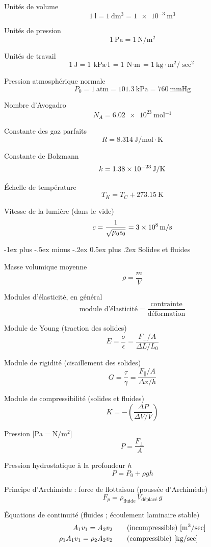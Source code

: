 \documentclass[10pt,landscape]{article}
\makeatletter
\renewcommand{\section}{\@startsection{section}{1}{0mm}%
                                {-1ex plus -.5ex minus -.2ex}%
                                {0.5ex plus .2ex}%
                                {\normalfont\large\bfseries}}
\makeatother
\begin{document}
\begin{multicols}{3}
Unités de volume
\[ \SI{1}{\litre} = \SI{1}{\deci\meter^3} =  \SI{1e-3}{\meter^3} \]

Unités de pression
\[ \SI{1}{\pascal} = \SI{1}{\newton/\meter^2} \]

Unités de travail
\[ \SI{1}{\joule} = \SI{1}{\kilo\pascal\cdot\litre} = \SI{1}{\newton\cdot\meter} = \SI{1}{\kilo\gram\cdot\metre^2/\sec^2} \]

Pression atmosphérique normale
\[ P_0 = \SI{1}{\text{atm}} = \SI{101,3}{\kilo\pascal}
= \SI{760}{\mmHg} \]

Nombre d'Avogadro
\[ N_A = \SI{6,02e23}{\mol^{-1}}\]

Constante des gaz parfaits
\[ R = \SI{8,314}{\joule/\mole\cdot\kelvin} \]

Constante de Bolzmann
\[ k = \SI{1,38E-23}{\joule/\kelvin} \]

Échelle de température
\[ T_K = T_C + \SI{273,15}{\kelvin} \]

Vitesse de la lumière (dans le vide)
\[ c = \frac{1}{\sqrt{\mu_0 \epsilon_0}} = \SI{3E8}{\meter/\second}  \]

\hrulefill


\section{Solides et fluides}

Masse volumique moyenne
\[ \rho = \frac{m}{V} \]

Modules d'élasticité, en général
\[ \text{module d'élasticité} = \frac{\text{contrainte}}{\text{déformation}} \]

Module de Young (traction des solides)
\[ E = \frac{\sigma}{\epsilon} 
= \frac{{F_\perp}/{A}}{{\Delta L}/{L_0}} 
\]

Module de rigidité (cisaillement des solides)
\[ G = \frac{\tau}{\gamma} 
= \frac{F_\parallel/A}{{\Delta x}/{h}} 
\]

Module de compressibilité (solides et fluides)
\[ K = - \left(\frac{\Delta P}{\Delta V / V} \right)\]

Pression [$\si{\pascal} = \si{\newton/\metre^2}$]
\[ P = \frac{F_\perp}{A} \]

Pression hydrostatique à la profondeur $h$
\[ P = P_0 + \rho gh \]

Principe d'Archimède : force de flottaison (poussée d'Archimède)
\[ F_p = \rho_\text{fluide} \, V_\text{déplacé} \, g \]

Équations de continuité (fluides ; écoulement laminaire stable)
\begin{align*}
	A_1 v_1 = A_2 v_2 \qquad &\text{(incompressible) [\si{\meter^3/\sec]}} \\
	\rho_1 A_1 v_1 = \rho_2 A_2 v_2 \qquad &\text{(compressible) [\si{\kilogram/\sec}]}
\end{align*}


\end{multicols}
\end{document}
